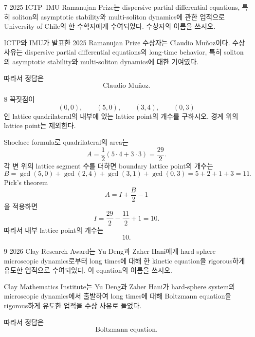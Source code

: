 \begin{problem}{7}
2025 ICTP--IMU Ramanujan Prize는 dispersive partial differential equations, 특히 soliton의 asymptotic stability와 multi-soliton dynamics에 관한 업적으로 University of Chile의 한 수학자에게 수여되었다. 수상자의 이름을 쓰시오.
\end{problem}

\begin{solution}
ICTP와 IMU가 발표한 2025 Ramanujan Prize 수상자는 Claudio Muñoz이다. 수상 사유는 dispersive partial differential equations의 long-time behavior, 특히 soliton의 asymptotic stability와 multi-soliton dynamics에 대한 기여였다.

따라서 정답은
\[
    \boxed{\text{Claudio Mu\~noz}}.
\]
\end{solution}

\begin{problem}{8}
꼭짓점이
\[
    (0,0),\qquad(5,0),\qquad(3,4),\qquad(0,3)
\]
인 lattice quadrilateral의 내부에 있는 lattice point의 개수를 구하시오. 경계 위의 lattice point는 제외한다.
\end{problem}

\begin{solution}
Shoelace formula로 quadrilateral의 area는
\[
    A
    =
    \frac12(5\cdot4+3\cdot3)
    =
    \frac{29}{2}.
\]
각 변 위의 lattice segment 수를 더하면 boundary lattice point의 개수는
\[
    B
    =
    \gcd(5,0)+\gcd(2,4)+\gcd(3,1)+\gcd(0,3)
    =5+2+1+3
    =11.
\]
Pick's theorem
\[
    A=I+\frac{B}{2}-1
\]
을 적용하면
\[
    I
    =
    \frac{29}{2}-\frac{11}{2}+1
    =10.
\]
따라서 내부 lattice point의 개수는
\[
    \boxed{10}.
\]
\end{solution}

\begin{problem}{9}
2026 Clay Research Award는 Yu Deng과 Zaher Hani에게 hard-sphere microscopic dynamics로부터 long times에 대해 한 kinetic equation을 rigorous하게 유도한 업적으로 수여되었다. 이 equation의 이름을 쓰시오.
\end{problem}

\begin{solution}
Clay Mathematics Institute는 Yu Deng과 Zaher Hani가 hard-sphere system의 microscopic dynamics에서 출발하여 long times에 대해 Boltzmann equation을 rigorous하게 유도한 업적을 수상 사유로 들었다.

따라서 정답은
\[
    \boxed{\text{Boltzmann equation}}.
\]
\end{solution}

